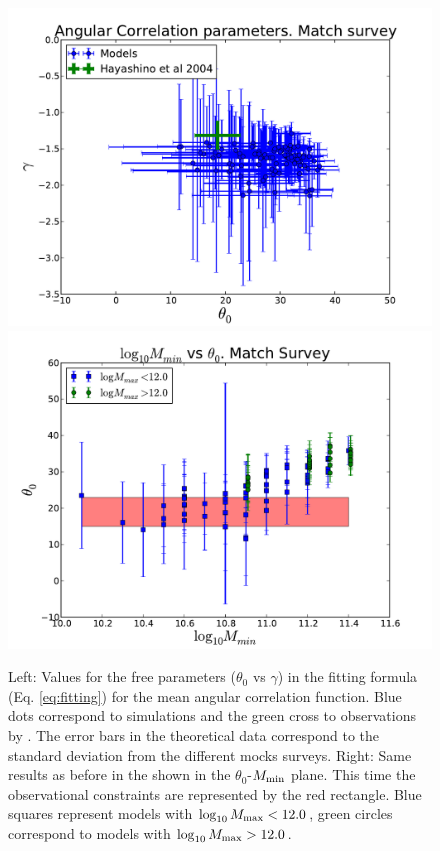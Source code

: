 \documentclass[usenatbib]{mn2e}
\begin{document}
\begin{figure}
\begin{center}
\includegraphics[width=0.46\linewidth,angle=0]{./plots/power_law_correlation.pdf} 
\hspace{5mm}  
\includegraphics[width=0.46\linewidth,angle=0]{./plots/mmin_vs_correlation.pdf} 
\end{center}
\caption{Left: Values for the free parameters ($\theta_{0}$ vs $\gamma$) 
in the fitting formula (Eq. \ref{eq:fitting}) for the mean angular
correlation function. Blue dots correspond to simulations and the green cross to
observations by \citet{Hayashino2004}. The error bars in the 
theoretical data correspond to the standard deviation from the
different mocks surveys. Right: Same results as before in the shown in
the $\theta_{0}$-$M_{\rm min}$ plane. This time the observational
constraints are represented by the red rectangle. Blue squares
represent models with $\log_{10} M_{\rm  max}<12.0$, green circles
correspond to models with $\log_{10} M_{\rm max}>12.0$. 
\label{figure:correlation_parameters}}
\end{figure} 
\end{document}
